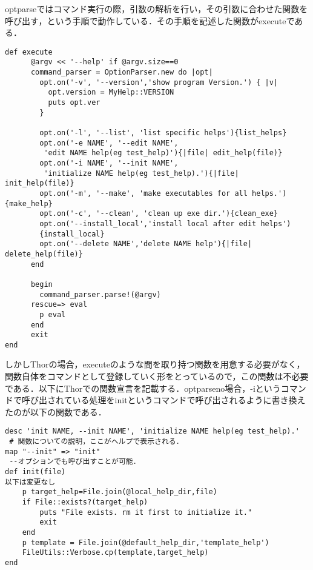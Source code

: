 optparseではコマンド実行の際，引数の解析を行い，その引数に合わせた関数を呼び出す，という手順で動作している．その手順を記述した関数がexecuteである．


\begin{screen}
{\small
\begin{verbatim}
def execute
      @argv << '--help' if @argv.size==0
      command_parser = OptionParser.new do |opt|
        opt.on('-v', '--version','show program Version.') { |v|
          opt.version = MyHelp::VERSION
          puts opt.ver
        }
        
        opt.on('-l', '--list', 'list specific helps'){list_helps}
        opt.on('-e NAME', '--edit NAME',
         'edit NAME help(eg test_help)'){|file| edit_help(file)}
        opt.on('-i NAME', '--init NAME',
         'initialize NAME help(eg test_help).'){|file| init_help(file)}
        opt.on('-m', '--make', 'make executables for all helps.'){make_help}
        opt.on('-c', '--clean', 'clean up exe dir.'){clean_exe}
        opt.on('--install_local','install local after edit helps')
        {install_local}
        opt.on('--delete NAME','delete NAME help'){|file| delete_help(file)}
      end
      
      begin
        command_parser.parse!(@argv)
      rescue=> eval
        p eval
      end
      exit
end
\end{verbatim}}
\end{screen}

しかしThorの場合，executeのような間を取り持つ関数を用意する必要がなく，関数自体をコマンドとして登録していく形をとっているので，この関数は不必要である．以下にThorでの関数宣言を記載する．optparseno場合，-iというコマンドで呼び出されている処理をinitというコマンドで呼び出されるように書き換えたのが以下の関数である．


\begin{screen}
{\small
\begin{verbatim}
desc 'init NAME, --init NAME', 'initialize NAME help(eg test_help).'
 # 関数についての説明，ここがヘルプで表示される．
map "--init" => "init"
 --オプションでも呼び出すことが可能．
def init(file)
以下は変更なし
    p target_help=File.join(@local_help_dir,file)
    if File::exists?(target_help)
        puts "File exists. rm it first to initialize it."
        exit
    end
    p template = File.join(@default_help_dir,'template_help')
    FileUtils::Verbose.cp(template,target_help)
end
\end{verbatim}}
\end{screen}


